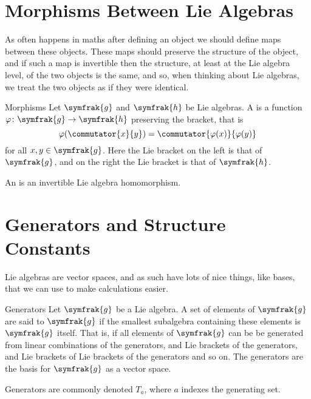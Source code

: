 \documentclass[fleqn]{NotesClass}
\renewcommand{\lie}[1]{\symfrak{#1}}
\begin{document}
    \section{Morphisms Between Lie Algebras}
    As often happens in maths after defining an object we should define maps between these objects.
    These maps should preserve the structure of the object, and if such a map is invertible then the structure, at least at the Lie algebra level, of the two objects is the same, and so, when thinking about Lie algebras, we treat the two objects as if they were identical.
    \begin{dfn}{Morphisms}{}
        Let \(\lie{g}\) and \(\lie{h}\) be Lie algebras.
        A  is a function \(\varphi \colon \lie{g} \to \lie{h}\) preserving the bracket, that is
        \begin{equation}
            \varphi(\commutator{x}{y}) = \commutator{\varphi(x)}{\varphi(y)}
        \end{equation}
        for all \(x, y \in \lie{g}\).
        Here the Lie bracket on the left is that of \(\lie{g}\), and on the right the Lie bracket is that of \(\lie{h}\).
        
        An  is an invertible Lie algebra homomorphism.
    \end{dfn}
    
    \section{Generators and Structure Constants}
    Lie algebras are vector spaces, and as such have lots of nice things, like bases, that we can use to make calculations easier.
    \begin{dfn}{Generators}{}
        Let \(\lie{g}\) be a Lie algebra.
        A set of elements of \(\lie{g}\) are said to  \(\lie{g}\) if the smallest subalgebra containing these elements is \(\lie{g}\) itself.
        That is, if all elements of \(\lie{g}\) can be be generated from linear combinations of the generators, and Lie brackets of the generators, and Lie brackets of Lie brackets of the generators and so on.
        The generators are the basis for \(\lie{g}\) as a vector space.
    \end{dfn}
    
    \begin{ntn}{}{}
        Generators are commonly denoted \(T_a\), where \(a\) indexes the generating set.
    \end{ntn}
    
\end{document}
